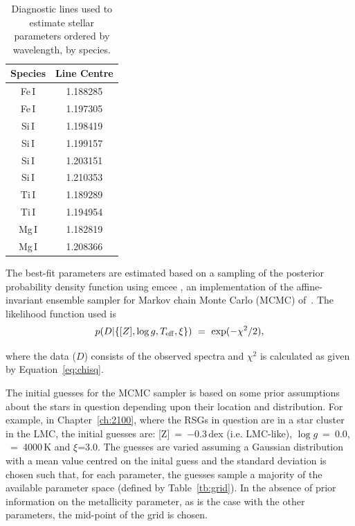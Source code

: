 \begin{table}
\caption[Diagnostic lines]{Diagnostic lines used to estimate stellar parameters ordered by wavelength, by species.\label{tb:lines}}
\scriptsize
\begin{center}
\begin{tabular}{cc}
 \hline
 \hline
Species & Line Centre \\
 \hline
Fe\,I & 1.188285 \\
Fe\,I & 1.197305 \\
Si\,I & 1.198419 \\
Si\,I & 1.199157 \\
Si\,I & 1.203151 \\
Si\,I & 1.210353 \\
Ti\,I & 1.189289 \\
Ti\,I & 1.194954 \\
Mg\,I & 1.182819\\
Mg\,I & 1.208366\\
 \hline
\end{tabular}
\end{center}
\end{table}

The best-fit parameters are estimated based on a sampling of the posterior probability density function using emcee
\cite{2013PASP..125..306F},
an implementation of the affine-invariant ensemble sampler for Markov chain Monte Carlo (MCMC) of~\cite{2010CAMCS.5..65G}.
The likelihood function used is
\begin{equation}
    p(D|\{[Z], \log g, T_{\rm eff}, \xi\})~=~\exp(-\chi^{2}/2), \label{eq:like}
\end{equation}

\noinent where the data ($D$) consists of the observed spectra and $\chi^{2}$ is calculated as given by Equation~\ref{eq:chisq}.

The initial guesses for the MCMC sampler is based on some prior assumptions about the stars in question depending upon their location and distribution.
For example, in Chapter~\ref{ch:2100}, where the RSGs in question are in a star cluster in the LMC, the initial guesses are: [Z]~=~$-$0.3\,dex (i.e. LMC-like), $\log g$~=~0.0, \Teff~=~4000\,K and $\xi$=3.0.
The guesses are varied assuming a Gaussian distribution with a mean value centred on the inital guess and the standard deviation is chosen such that, for each parameter, the guesses sample a majority of the available parameter space (defined by Table~\ref{tb:grid}).
In the absence of prior information on the metallicity parameter, as is the case with the other parameters, the mid-point of the grid is chosen.

